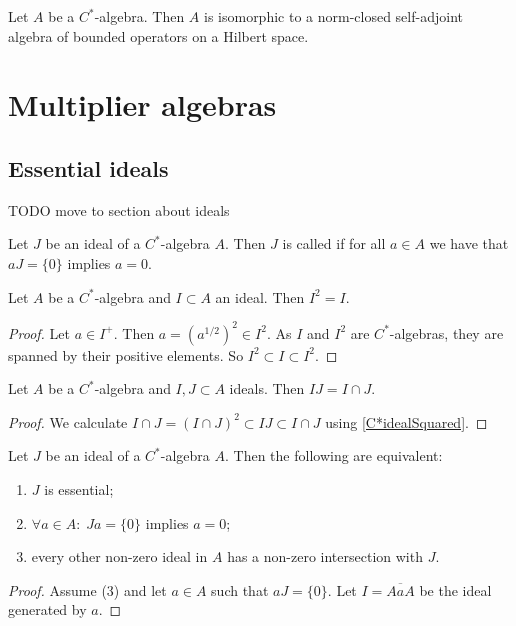 \begin{theorem}
Let $A$ be a $C^*$-algebra. Then $A$ is isomorphic to a norm-closed self-adjoint algebra of bounded operators on a Hilbert space.
\end{theorem}


\section{Multiplier algebras}
\subsection{Essential ideals}
TODO move to section about ideals
\begin{definition}
Let $J$ be an ideal of a $C^*$-algebra $A$. Then $J$ is called  if for all $a\in A$ we have that $aJ = \{0\}$ implies $a=0$.
\end{definition}

\begin{lemma} \label{C*idealSquared}
Let $A$ be a $C^*$-algebra and $I\subset A$ an ideal. Then $I^2 = I$.
\end{lemma}
\begin{proof}
Let $a\in I^+$. Then $a = (a^{1/2})^2\in I^2$. As $I$ and $I^2$ are $C^*$-algebras, they are spanned by their positive elements. So $I^2 
\subset I \subset I^2$.
\end{proof}
\begin{lemma} \label{productC*ideals}
Let $A$ be a $C^*$-algebra and $I,J\subset A$ ideals. Then $IJ = I\cap J$.
\end{lemma}
\begin{proof}
We calculate $I\cap J = (I\cap J)^2 \subset IJ \subset I\cap J$ using \ref{C*idealSquared}.
\end{proof}

\begin{proposition}
Let $J$ be an ideal of a $C^*$-algebra $A$. Then the following are equivalent:
\begin{enumerate}
\item $J$ is essential;
\item $\forall a\in A:\;Ja = \{0\}$ implies $a=0$;
\item every other non-zero ideal in $A$ has a non-zero intersection with $J$.
\end{enumerate}
\end{proposition}
\begin{proof}
Assume (3) and let $a\in A$ such that $aJ=\{0\}$. Let $I= \overline{AaA}$ be the ideal generated by $a$.
\end{proof}

